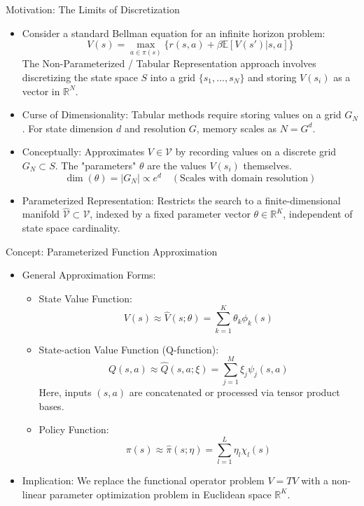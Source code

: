\documentclass[aspectratio=169]{beamer}
\newcommand{\1}{\mathbf{1}}
\begin{document}
\begin{frame}{Motivation: The Limits of Discretization}
\begin{itemize}
    \item Consider a standard Bellman equation for an infinite horizon problem:
    $$ V(s) = \max_{a \in \pi(s)} \{ r(s,a) + \beta \mathbb{E}[V(s') | s, a] \} $$
    The Non-Parameterized / Tabular Representation approach involves discretizing the state space $S$ into a grid $\{s_1, ..., s_N\}$ and storing $V(s_i)$ as a vector in $\mathbb{R}^N$.
   \item Curse of Dimensionality: Tabular methods require storing values on a grid $G_N$. For state dimension $d$ and resolution $G$, memory scales as $N = G^d$. 
    \item Conceptually: Approximates $V \in \mathcal{V}$ by recording values on a discrete grid $G_N \subset S$. The "parameters" $\theta$ are the values $V(s_i)$ themselves.
    $$ \dim(\theta) = |G_N| \propto e^d \quad (\text{Scales with domain resolution}) $$
    \item Parameterized Representation: Restricts the search to a finite-dimensional manifold $\hat{\mathcal{V}} \subset \mathcal{V}$, indexed by a fixed parameter vector $\theta \in \mathbb{R}^K$, independent of state space cardinality.

\end{itemize}
\end{frame}

\begin{frame}{Concept: Parameterized Function Approximation}
    \begin{itemize}
    \item General Approximation Forms:
    \begin{itemize}
        \item State Value Function: 
        $$ V(s) \approx \hat{V}(s; \theta) = \sum_{k=1}^K \theta_k \phi_k(s) $$
        \item State-action Value Function (Q-function): 
        $$ Q(s,a) \approx \hat{Q}(s,a; \xi) = \sum_{j=1}^M \xi_j \psi_j(s,a) $$
        Here, inputs $(s,a)$ are concatenated or processed via tensor product bases.
        \item Policy Function:
        $$ \pi(s) \approx \hat{\pi}(s; \eta) = \sum_{l=1}^L \eta_l \chi_l(s) $$
    \end{itemize}
    \item Implication: We replace the functional operator problem $V = T V$ with a non-linear parameter optimization problem in Euclidean space $\mathbb{R}^K$.
    \end{itemize}
\end{frame}
\end{document}
